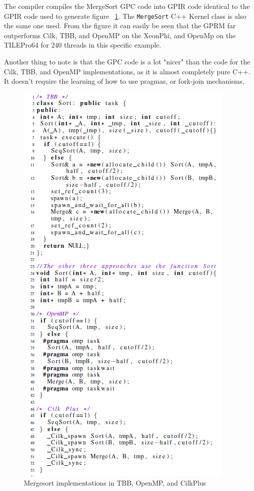 The compiler compiles the MergeSort GPC code into GPIR code identical to the GPIR code used to generate figure ~\ref{fig:bench}.
The \texttt{MergeSort} C++ Kernel class is also the same one used. From the figure it can easily be seen that the GPRM
far outperforms Cilk, TBB, and OpenMP on the XeonPhi, and OpenMp on the TILEPro64 for 240 threads in this specific example. 

Another thing to note is that the GPC code is a lot "nicer" than the code for the Cilk, TBB, and OpenMP
implementations, as it is almost completely pure C++.  It doesn't require the learning of how to use pragmas, 
or fork-join mechanisms.

\begin{figure}[!htb]
\includegraphics{graphs/mergebad.png}
\caption{Mergesort implementations in TBB, OpenMP, and CilkPlus \cite{GPRMBench}}
\label{fig:bench}
\end{figure}



